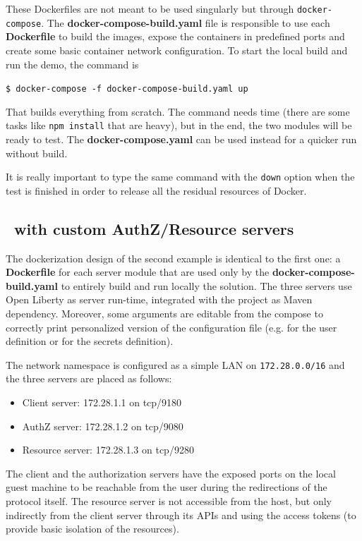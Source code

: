 These Dockerfiles are not meant to be used singularly but through \texttt{docker-compose}. The \textbf{docker-compose-build.yaml} file is responsible to use each \textbf{Dockerfile} to build the images, expose the containers in predefined ports and create some basic container network configuration. To start the local build and run the demo, the command is

  \texttt{\$ docker-compose -f docker-compose-build.yaml up}

\noindent That builds everything from scratch. The command needs time (there are some tasks like \texttt{npm install} that are heavy), but in the end, the two modules will be ready to test. The \textbf{docker-compose.yaml} can be used instead for a quicker run without build.

It is really important to type the same command with the \texttt{down} option when the test is finished in order to release all the residual resources of Docker.

\subsection{\oauth\ with custom AuthZ/Resource servers}
The dockerization design of the second example is identical to the first one: a \textbf{Dockerfile} for each server module that are used only by the \textbf{docker-compose-build.yaml} to entirely build and run locally the solution. The three servers use Open Liberty as server run-time, integrated with the project as Maven dependency. Moreover, some arguments are editable from the compose to correctly print personalized version of the configuration file (e.g. for the user definition or for the secrets definition).

The network namespace is configured as a simple LAN on \texttt{172.28.0.0/16} and the three servers are placed as follows:

\begin{itemize}
    \item Client server: 172.28.1.1 on tcp/9180
    \item AuthZ server: 172.28.1.2 on tcp/9080
    \item Resource server: 172.28.1.3 on tcp/9280
\end{itemize}

The client and the authorization servers have the exposed ports on the local guest machine to be reachable from the user during the redirections of the protocol itself. The resource server is not accessible from the host, but only indirectly from the client server through its APIs and using the access tokens (to provide basic isolation of the resources).
\label{docker}

